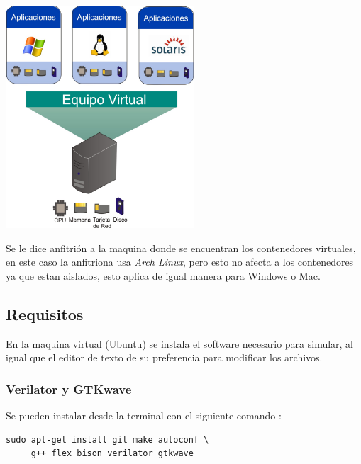 \documentclass[11pt]{/home/hao/dev/org/latex-plantilla/IEEEtran}
\begin{document}
\begin{center}
\includegraphics[width=7cm]{virtualizacion.jpg}
\end{center}

Se le dice anfitrión a la maquina donde se encuentran los
contenedores virtuales, en este caso la anfitriona usa \emph{Arch Linux},
pero esto no afecta a los contenedores ya que estan aislados, esto
aplica de igual manera para Windows o Mac.
\subsection{Requisitos}
\label{sec:orgc5df779}
En la maquina virtual (Ubuntu) se instala el software necesario
para simular, al igual que el editor de texto de su preferencia
para modificar los archivos.
\subsubsection{Verilator y GTKwave}
\label{sec:org0d8baab}
Se pueden instalar desde la terminal con el siguiente comando
\cite{verilator-instalacion}:
\begin{verbatim}
sudo apt-get install git make autoconf \
     g++ flex bison verilator gtkwave
\end{verbatim}



\end{document}
